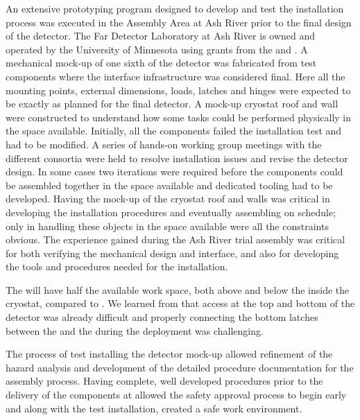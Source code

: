 An extensive prototyping program designed to develop and test the  installation process was executed in the  Assembly Area at Ash River prior to the final design of the  detector. 
The  Far Detector Laboratory at Ash River is owned and operated by the University of Minnesota using grants from the  and .
A mechanical mock-up of one sixth of the detector was fabricated from test components where the interface infrastructure was considered final. 
Here all the mounting points, external dimensions, loads, latches and hinges were expected to be exactly as planned for the final  detector.
A mock-up cryostat roof and wall were constructed to understand how some tasks could  be performed physically in the space available.
Initially, all the components failed the installation test and had to be modified. A series of hands-on working group meetings with the different consortia were held to resolve installation issues and revise the detector design. 
In some cases two iterations were required before the components could be assembled together in the space available and dedicated tooling had to be developed. 
Having the mock-up of the cryostat roof and walls was critical in developing the installation procedures and eventually assembling  on schedule; only in handling these objects in the space available were all the constraints obvious. 
The experience gained during the  Ash River trial assembly was critical for both verifying the mechanical design and interface, and also for developing the tools and procedures needed for the installation.

The   will have half the available work space,  both above and below the  inside the cryostat, compared to . 
We learned from  that access at the top and bottom of the detector was already 
difficult and properly connecting the bottom latches between the  and the  during the  deployment was challenging. 


The process of test installing the detector mock-up allowed refinement of the hazard analysis and development of the detailed procedure documentation for the assembly process. 
Having complete, well developed procedures prior to the delivery of the components at  allowed the safety approval process to begin early and along with the test installation, created a safe work environment.



